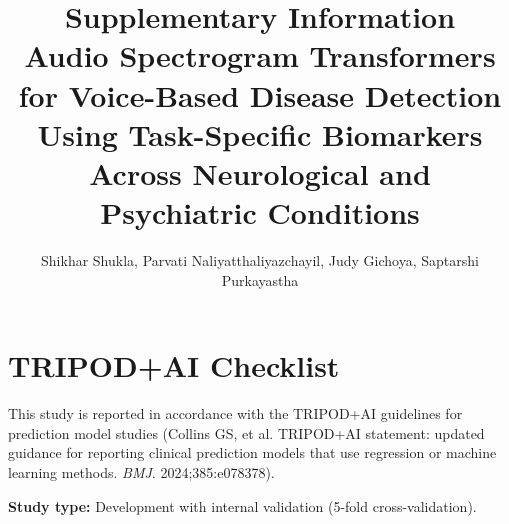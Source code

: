 \documentclass[11pt,a4paper]{article}
\title{\textbf{Supplementary Information}\\[0.5em]
\large Audio Spectrogram Transformers for Voice-Based Disease Detection\\
Using Task-Specific Biomarkers Across Neurological and Psychiatric Conditions}
\author{Shikhar Shukla, Parvati Naliyatthaliyazchayil, Judy Gichoya, Saptarshi Purkayastha}
\date{}
\begin{document}
\maketitle

\tableofcontents
\newpage

\section{TRIPOD+AI Checklist}

This study is reported in accordance with the TRIPOD+AI guidelines for prediction model studies (Collins GS, et al. TRIPOD+AI statement: updated guidance for reporting clinical prediction models that use regression or machine learning methods. \textit{BMJ}. 2024;385:e078378).

\vspace{0.5em}
\noindent\textbf{Study type:} Development with internal validation (5-fold cross-validation).

\vspace{1em}
\end{document}
